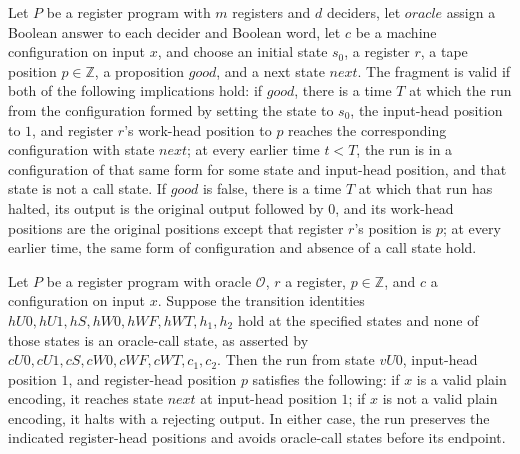 \begin{definition}
\label{Complexity.LogProg.FragOK}
\leanok
{}
Let $P$ be a register program with $m$ registers and $d$ deciders, let $oracle$ assign a
Boolean answer to each decider and Boolean word, let $c$ be a machine configuration on
input $x$, and choose an initial state $s_0$, a register $r$, a tape position
$p\in\mathbb Z$, a proposition $good$, and a next state $next$. The fragment is valid if
both of the following implications hold: if $good$, there is a time $T$ at which the run
from the configuration formed by setting the state to $s_0$, the input-head position to
$1$, and register $r$'s work-head position to $p$ reaches the corresponding
configuration with state $next$; at every earlier time $t<T$, the run is in a
configuration of that same form for some state and input-head position, and that state
is not a call state. If $good$ is false, there is a time $T$ at which that run has
halted, its output is the original output followed by $0$, and its work-head positions
are the original positions except that register $r$'s position is $p$; at every earlier
time, the same form of configuration and absence of a call state hold.
\end{definition}

\begin{lemma}
\label{Complexity.LogProg.valPlain_run}
\leanok
{}
Let $P$ be a register program with oracle $\mathcal O$, $r$ a register, $p\in\mathbb Z$,
and $c$ a configuration on input $x$. Suppose the transition identities
$hU0,hU1,hS,hW0,hWF,hWT,h_1,h_2$ hold at the specified states and none of those states
is an oracle-call state, as asserted by $cU0,cU1,cS,cW0,cWF,cWT,c_1,c_2$. Then the run
from state $vU0$, input-head position $1$, and register-head position $p$ satisfies the
following: if $x$ is a valid plain encoding, it reaches state $next$ at input-head
position $1$; if $x$ is not a valid plain encoding, it halts with a rejecting output. In
either case, the run preserves the indicated register-head positions and avoids
oracle-call states before its endpoint.
\end{lemma}
